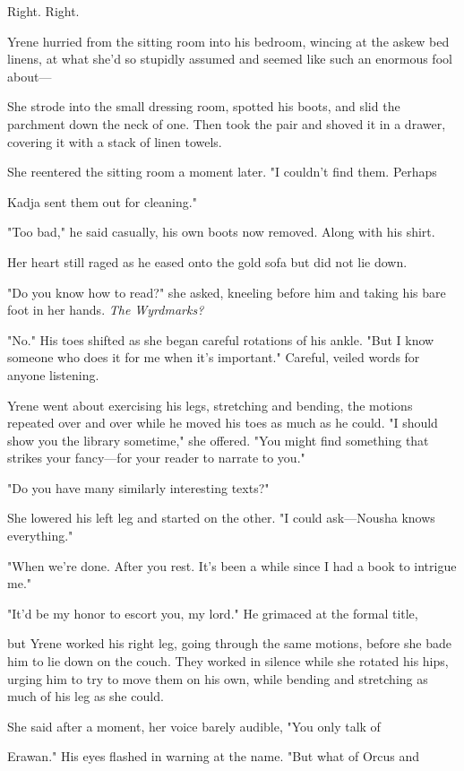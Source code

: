 Right. Right.

Yrene hurried from the sitting room into his bedroom, wincing at the askew bed linens, at what she'd so stupidly assumed and seemed like such an enormous fool about---

She strode into the small dressing room, spotted his boots, and slid the parchment down the neck of one. Then took the pair and shoved it in a drawer, covering it with a stack of linen towels.

She reentered the sitting room a moment later. "I couldn't find them. Perhaps

Kadja sent them out for cleaning."

"Too bad," he said casually, his own boots now removed. Along with his shirt.

Her heart still raged as he eased onto the gold sofa but did not lie down.

"Do you know how to read?" she asked, kneeling before him and taking his bare foot in her hands. \emph{The Wyrdmarks?}

"No." His toes shifted as she began careful rotations of his ankle. "But I know someone who does it for me when it's important." Careful, veiled words for anyone listening.

Yrene went about exercising his legs, stretching and bending, the motions repeated over and over while he moved his toes as much as he could. "I should show you the library sometime," she offered. "You might find something that strikes your fancy---for your reader to narrate to you."

"Do you have many similarly interesting texts?"

She lowered his left leg and started on the other. "I could ask---Nousha knows everything."

"When we're done. After you rest. It's been a while since I had a book to  intrigue me."

"It'd be my honor to escort you, my lord." He grimaced at the formal title,

but Yrene worked his right leg, going through the same motions, before she bade him to lie down on the couch. They worked in silence while she rotated his hips, urging him to try to move them on his own, while bending and stretching as much of his leg as she could.

She said after a moment, her voice barely audible, "You only talk of

Erawan." His eyes flashed in warning at the name. "But what of Orcus and

